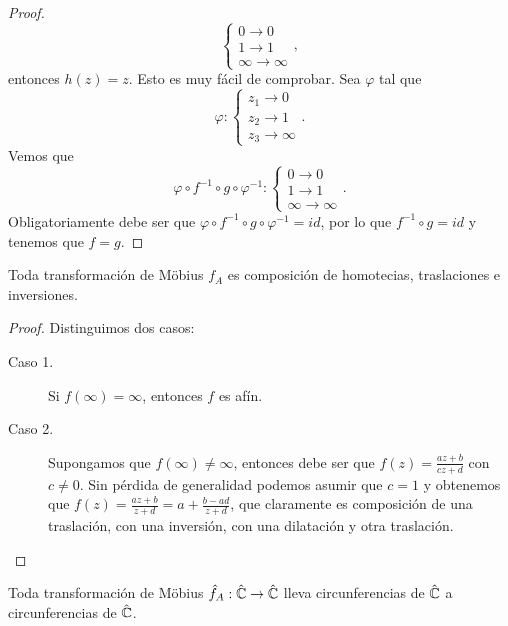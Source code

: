 \begin{proof}
\[\begin{cases}
0 \to 0 \\
1 \to 1 \\
\infty \to \infty
\end{cases}
,\]
entonces $\displaystyle h\left(z\right)= z $. Esto es muy fácil de comprobar. Sea $\displaystyle \varphi $ tal que 
\[\varphi:
\begin{cases}
z_{1} \to 0 \\
z_{2} \to 1 \\
z_{3} \to \infty
\end{cases}
.\]
Vemos que 
\[\varphi \circ f^{-1}\circ g\circ \varphi^{-1} : 
\begin{cases}
0 \to 0 \\
1 \to 1 \\
\infty \to \infty 
\end{cases}
.\]
Obligatoriamente debe ser que $\displaystyle \varphi\circ f^{-1}\circ g\circ\varphi^{-1}=id $, por lo que $\displaystyle f^{-1}\circ g = id $ y tenemos que $\displaystyle f = g $.
\end{proof}
\begin{theorem}
Toda transformación de Möbius $\displaystyle f_{A} $ es composición de homotecias, traslaciones e inversiones. 
\end{theorem}
\begin{proof}
Distinguimos dos casos:
\begin{description}
\item[Caso 1.] Si $\displaystyle f\left(\infty\right)=\infty $, entonces $\displaystyle f $ es afín. 
\item[Caso 2.] Supongamos que $\displaystyle f\left(\infty\right)\neq \infty  $, entonces debe ser que $\displaystyle f\left(z\right)=\frac{az + b}{cz + d} $ con $\displaystyle c \neq 0 $. Sin pérdida de generalidad podemos asumir que $\displaystyle c= 1 $ y obtenemos que $\displaystyle f\left(z\right)=\frac{az + b}{z + d}=a + \frac{b-ad}{z + d} $,
	que claramente es composición de una traslación, con una inversión, con una dilatación y otra traslación.
\end{description}
\end{proof}
\begin{theorem}
Toda transformación de Möbius $\displaystyle \hat{f}_{A}: \hat{\mathbb{C}} \to \hat{\mathbb{C}} $ lleva circunferencias de $\displaystyle \hat{\mathbb{C}} $ a circunferencias de $\displaystyle \hat{\mathbb{C}} $. 
\end{theorem}
